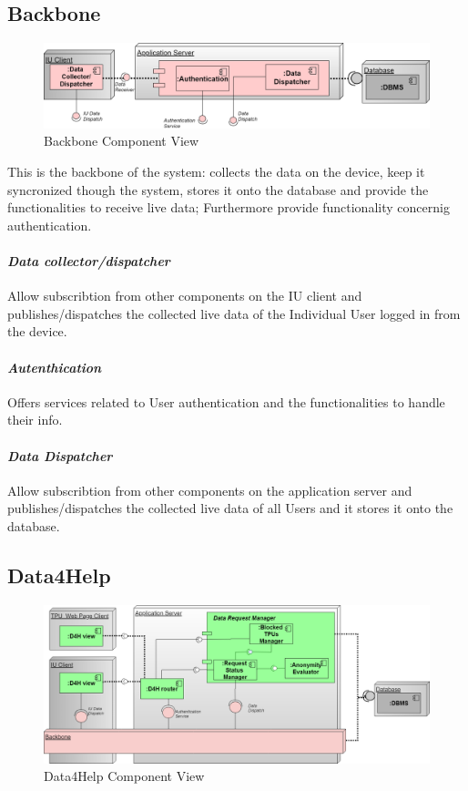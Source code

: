 \subsection{Backbone}
\label{subsect:backboneComponentView}
\begin{figure}[H]
\caption{Backbone Component View}
\includegraphics[width = \textwidth]{sections/architecturalDesign/BackboneDiagram.png}
\end{figure}
This is the backbone of the system: collects the data on the device, keep it syncronized though the system, stores it onto the database and provide the functionalities to receive live data; Furthermore provide functionality concernig authentication.
\paragraph{\textit{Data collector/dispatcher}} Allow subscribtion from other components on the IU client and publishes/dispatches the collected live data of the Individual User logged in from the device. 
\paragraph{\textit{Autenthication}} Offers services related to User authentication and the functionalities to handle their info.
\paragraph{\textit{Data Dispatcher}} Allow subscribtion from other components on the application server and publishes/dispatches the collected live data of all Users and it stores it onto the database.
\subsection{Data4Help}
\label{subsect:D4HComponentView}
\begin{figure}[H]
\caption{Data4Help Component View}
\includegraphics[width = \textwidth]{sections/architecturalDesign/D4HDiagram.png}
\end{figure}
